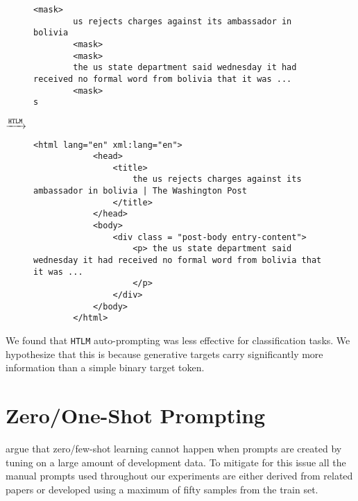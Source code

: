 \documentclass[11pt,a4paper]{article}
\newcommand{\HTLM}{\texttt{HTLM}}
\begin{document}
\begin{figure*}[!htbp]
\centering

\begin{subfigure}{.45\textwidth}
    \centering
    \begin{lstlisting}[numbers=none, basicstyle=\tiny\ttfamily]
        <mask> 
        us rejects charges against its ambassador in bolivia 
        <mask>
        <mask> 
        the us state department said wednesday it had received no formal word from bolivia that it was ... 
        <mask>
s    \end{lstlisting}
\end{subfigure} $\xrightarrow{\text{\HTLM{}}}$
\begin{subfigure}{.45\textwidth}
    \centering
    \begin{lstlisting}[numbers=none, basicstyle=\tiny\ttfamily]
        <html lang="en" xml:lang="en">
            <head>
                <title>
                    the us rejects charges against its ambassador in bolivia | The Washington Post
                </title>
            </head>
            <body>
                <div class = "post-body entry-content"> 
                    <p> the us state department said wednesday it had received no formal word from bolivia that it was ...
                    </p>
                </div>
            </body>
        </html>
    \end{lstlisting}
\end{subfigure}
\cprotect\caption{An example of auto-prompting using a sample from the train-set of the Gigaword dataset. \HTLM{} places the summary inside of a \verb+<title>+ inside of a \verb+<head>+ element, while placing the article in a \verb+<div>+ element with an \verb+entry-content+ attribute value for attribute \verb+class+ which is common on news web-sites.}
\label{fig:auto_prompting}
\end{figure*}

We found that \HTLM{} auto-prompting was less effective for classification tasks. We hypothesize that this is because generative targets carry significantly more information than a simple binary target token.

\section{Zero/One-Shot Prompting}
\citet{true_few_shot_learning} argue that zero/few-shot learning cannot happen when prompts are created by tuning on a large amount of development data. To mitigate for this issue all the manual prompts used throughout our experiments are either derived from related papers or developed using a maximum of fifty samples from the train set.
\end{document}

